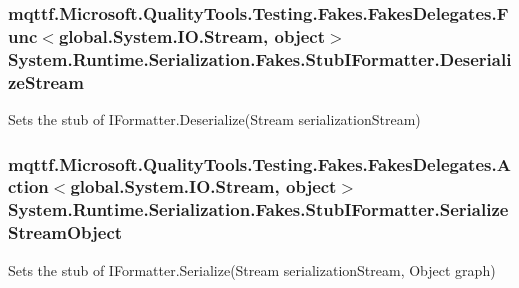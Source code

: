 \hypertarget{class_system_1_1_runtime_1_1_serialization_1_1_fakes_1_1_stub_i_formatter_ae2015e5bbf150aa04a84bc172277d5d4}{
\subsubsection[{Deserialize\-Stream}]{\setlength{\rightskip}{0pt plus 5cm}mqttf.\-Microsoft.\-Quality\-Tools.\-Testing.\-Fakes.\-Fakes\-Delegates.\-Func$<$global.\-System.\-I\-O.\-Stream, object$>$ System.\-Runtime.\-Serialization.\-Fakes.\-Stub\-I\-Formatter.\-Deserialize\-Stream}}\label{class_system_1_1_runtime_1_1_serialization_1_1_fakes_1_1_stub_i_formatter_ae2015e5bbf150aa04a84bc172277d5d4}


Sets the stub of I\-Formatter.\-Deserialize(\-Stream serialization\-Stream)

\hypertarget{class_system_1_1_runtime_1_1_serialization_1_1_fakes_1_1_stub_i_formatter_afcc2fc1ab7abba7e6a6f84c1251ab9b5}{
\subsubsection[{Serialize\-Stream\-Object}]{\setlength{\rightskip}{0pt plus 5cm}mqttf.\-Microsoft.\-Quality\-Tools.\-Testing.\-Fakes.\-Fakes\-Delegates.\-Action$<$global.\-System.\-I\-O.\-Stream, object$>$ System.\-Runtime.\-Serialization.\-Fakes.\-Stub\-I\-Formatter.\-Serialize\-Stream\-Object}}\label{class_system_1_1_runtime_1_1_serialization_1_1_fakes_1_1_stub_i_formatter_afcc2fc1ab7abba7e6a6f84c1251ab9b5}


Sets the stub of I\-Formatter.\-Serialize(\-Stream serialization\-Stream, Object graph)

